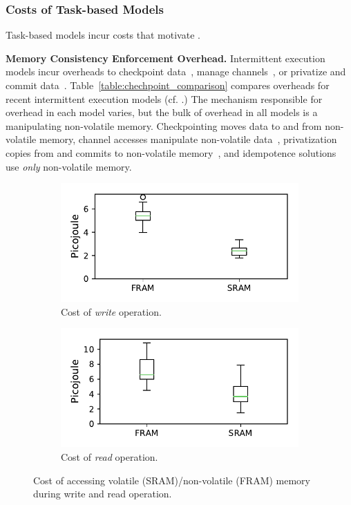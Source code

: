 \subsubsection{Costs of Task-based Models}

Task-based models incur costs that motivate \sys.

\textbf{Memory Consistency Enforcement Overhead.} Intermittent execution models incur overheads to checkpoint data~\cite{dino,ratchet,quickrecall,mementos}, manage channels~\cite{chain}, or privatize and commit data~\cite{alpaca}. Table~\ref{table:chechpoint_comparison} compares overheads for recent intermittent execution models (cf. \cite[Sec. 2.4]{alpaca}.) The mechanism responsible for overhead in each model varies, but the bulk of overhead in all models is a manipulating non-volatile memory. Checkpointing moves data to and from non-volatile memory, channel accesses manipulate non-volatile data~\cite{chain}, privatization copies from and commits to non-volatile memory~\cite{alpaca}, and idempotence solutions~\cite{ratchet} use {\em only} non-volatile memory.  

\begin{figure}
\begin{subfigure}[t]{.49\columnwidth}
	\centering \includegraphics[width=\columnwidth]{figures/fram_write}
	\caption{Cost of \emph{write} operation.}
\end{subfigure}%
\begin{subfigure}[t]{.49\columnwidth}
	\centering \includegraphics[width=\columnwidth]{figures/fram_read}
	\caption{Cost of \emph{read} operation.}
\end{subfigure}
	\caption{Cost of accessing volatile (SRAM)/non-volatile (FRAM) memory during write and read operation.}\label{fig:framEnergy}
\end{figure}

